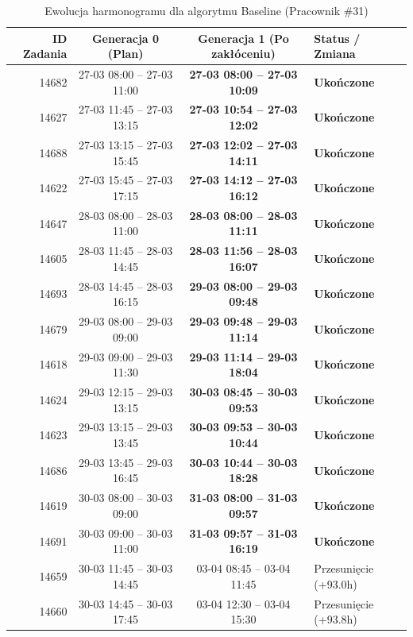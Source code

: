 \begin{table}[htbp]
\centering\small
\caption{Ewolucja harmonogramu dla algorytmu Baseline (Pracownik \#31)}
\label{tab:case_study_baseline_u31}
\begin{tabular}{|r|c|c|l|}
\hline
\textbf{ID Zadania} & \textbf{Generacja 0 (Plan)} & \textbf{Generacja 1 (Po zakłóceniu)} & \textbf{Status / Zmiana} \\ \hline
14682 & 27-03 08:00 -- 27-03 11:00 & \textbf{27-03 08:00 -- 27-03 10:09} & \textbf{Ukończone} \\ 
14627 & 27-03 11:45 -- 27-03 13:15 & \textbf{27-03 10:54 -- 27-03 12:02} & \textbf{Ukończone} \\ 
14688 & 27-03 13:15 -- 27-03 15:45 & \textbf{27-03 12:02 -- 27-03 14:11} & \textbf{Ukończone} \\ 
14622 & 27-03 15:45 -- 27-03 17:15 & \textbf{27-03 14:12 -- 27-03 16:12} & \textbf{Ukończone} \\ 
14647 & 28-03 08:00 -- 28-03 11:00 & \textbf{28-03 08:00 -- 28-03 11:11} & \textbf{Ukończone} \\ 
14605 & 28-03 11:45 -- 28-03 14:45 & \textbf{28-03 11:56 -- 28-03 16:07} & \textbf{Ukończone} \\ 
14693 & 28-03 14:45 -- 28-03 16:15 & \textbf{29-03 08:00 -- 29-03 09:48} & \textbf{Ukończone} \\ 
14679 & 29-03 08:00 -- 29-03 09:00 & \textbf{29-03 09:48 -- 29-03 11:14} & \textbf{Ukończone} \\ 
14618 & 29-03 09:00 -- 29-03 11:30 & \textbf{29-03 11:14 -- 29-03 18:04} & \textbf{Ukończone} \\ 
14624 & 29-03 12:15 -- 29-03 13:15 & \textbf{30-03 08:45 -- 30-03 09:53} & \textbf{Ukończone} \\ 
14623 & 29-03 13:15 -- 29-03 13:45 & \textbf{30-03 09:53 -- 30-03 10:44} & \textbf{Ukończone} \\ 
14686 & 29-03 13:45 -- 29-03 16:45 & \textbf{30-03 10:44 -- 30-03 18:28} & \textbf{Ukończone} \\ 
14619 & 30-03 08:00 -- 30-03 09:00 & \textbf{31-03 08:00 -- 31-03 09:57} & \textbf{Ukończone} \\ 
14691 & 30-03 09:00 -- 30-03 11:00 & \textbf{31-03 09:57 -- 31-03 16:19} & \textbf{Ukończone} \\ 
14659 & 30-03 11:45 -- 30-03 14:45 & 03-04 08:45 -- 03-04 11:45 & Przesunięcie (+93.0h) \\ 
14660 & 30-03 14:45 -- 30-03 17:45 & 03-04 12:30 -- 03-04 15:30 & Przesunięcie (+93.8h) \\ 

\end{tabular}
\end{table}
